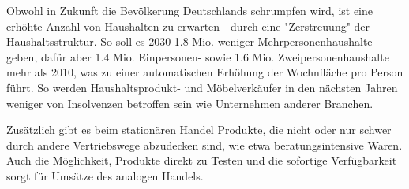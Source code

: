 \begin{folding}
Obwohl in Zukunft die Bevölkerung Deutschlands schrumpfen wird, ist eine erhöhte Anzahl von Haushalten zu erwarten - durch eine "Zerstreuung" der Haushaltsstruktur. So soll es 2030 1.8 Mio. weniger Mehrpersonenhaushalte geben, dafür aber 1.4 Mio. Einpersonen- sowie 1.6 Mio. Zweipersonenhaushalte mehr als 2010\cite[S. 35]{Nitt}, was zu einer automatischen Erhöhung der Wochnfläche pro Person führt. So werden Haushaltsprodukt- und Möbelverkäufer in den nächsten Jahren weniger von Insolvenzen betroffen sein wie Unternehmen anderer Branchen.

Zusätzlich gibt es beim stationären Handel Produkte, die nicht oder nur schwer durch andere Vertriebswege abzudecken sind, wie etwa beratungsintensive Waren. Auch die Möglichkeit, Produkte direkt zu Testen und die sofortige Verfügbarkeit sorgt für Umsätze des analogen Handels\cite[S. 2]{Maier}.



\end{folding}

